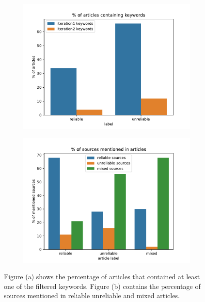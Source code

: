 \begin{figure}[H]
    \centering
    \begin{subfigure}{.5\textwidth}
      \centering
      \includegraphics[width=\linewidth]{obrazky-figures/percentage_keywords.pdf}
      \caption{}
      \label{fig:prc_keywords}
    \end{subfigure}%
    \begin{subfigure}{.5\textwidth}
      \centering
      \includegraphics[width=\linewidth]{obrazky-figures/percentage_sources.pdf}
      \caption{}
      \label{fig:prc_sources}
    \end{subfigure}
    \caption{Figure (a) shows the percentage of articles that contained at least one of the filtered keywords. Figure (b) contains the percentage of sources mentioned in reliable unreliable and mixed articles.}
    \label{fig:test3}
\end{figure}

